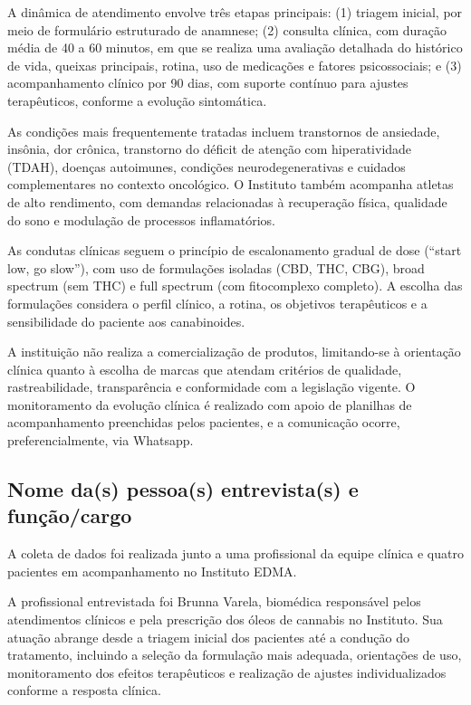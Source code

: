 \href{}{}\documentclass[12pt,portuguese,oneside]{article}
\begin{document}
A dinâmica de atendimento envolve três etapas principais: (1) triagem inicial, por meio de formulário estruturado de anamnese; (2) consulta clínica, com duração média de 40 a 60 minutos, em que se realiza uma avaliação detalhada do histórico de vida, queixas principais, rotina, uso de medicações e fatores psicossociais; e (3) acompanhamento clínico por 90 dias, com suporte contínuo para ajustes terapêuticos, conforme a evolução sintomática.

As condições mais frequentemente tratadas incluem transtornos de ansiedade, insônia, dor crônica, transtorno do déficit de atenção com hiperatividade (TDAH), doenças autoimunes, condições neurodegenerativas e cuidados complementares no contexto oncológico. O Instituto também acompanha atletas de alto rendimento, com demandas relacionadas à recuperação física, qualidade do sono e modulação de processos inflamatórios.

As condutas clínicas seguem o princípio de escalonamento gradual de dose (“start low, go slow”), com uso de formulações isoladas (CBD, THC, CBG), broad spectrum (sem THC) e full spectrum (com fitocomplexo completo). A escolha das formulações considera o perfil clínico, a rotina, os objetivos terapêuticos e a sensibilidade do paciente aos canabinoides.

A instituição não realiza a comercialização de produtos, limitando-se à orientação clínica quanto à escolha de marcas que atendam critérios de qualidade, rastreabilidade, transparência e conformidade com a legislação vigente. O monitoramento da evolução clínica é realizado com apoio de planilhas de acompanhamento preenchidas pelos pacientes, e a comunicação ocorre, preferencialmente, via Whatsapp.


\subsection{Nome da(s) pessoa(s) entrevista(s) e função/cargo}
\hspace{1em}A coleta de dados foi realizada junto a uma profissional da equipe clínica e quatro pacientes em acompanhamento no Instituto EDMA.

A profissional entrevistada foi Brunna Varela, biomédica responsável pelos atendimentos clínicos e pela prescrição dos óleos de cannabis no Instituto. Sua atuação abrange desde a triagem inicial dos pacientes até a condução do tratamento, incluindo a seleção da formulação mais adequada, orientações de uso, monitoramento dos efeitos terapêuticos e realização de ajustes individualizados conforme a resposta clínica.
\end{document}
